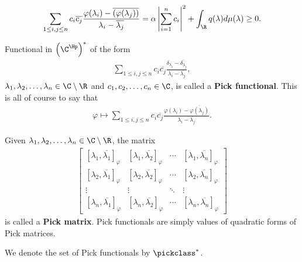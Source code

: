 \begin{align*}
	\sum_{1 \leq i, j \leq n} c_{i} \overline{c_{j}} \frac{\varphi(\lambda_{i}) - \overline{(\varphi(\lambda_{j}))}}{\lambda_{i} - \overline{\lambda_{j}}} = \alpha \left|\sum_{i = 1}^{n} c_{i}\right|^2 + \int_{\R} q(\lambda) d \mu (\lambda) \geq 0.
\end{align*}

\begin{maar}
	Functional in $\left(\C^{\Hp}\right)^{*}$ of the form
	\begin{align*}
		\sum_{1 \leq i, j \leq n} c_{i} \overline{c_{j}} \frac{\delta_{\lambda_{i}} - \overline{\delta_{\lambda_{j}}}}{\lambda_{i} - \overline{\lambda_{j}}},
	\end{align*}
	$\lambda_{1}, \lambda_{2}, \ldots, \lambda_{n} \in \C \setminus \R$ and $c_{1}, c_{2}, \ldots, c_{n} \in \C$, is called a \textbf{Pick functional}. This is all of course to say that
	\begin{align*}
		\varphi \mapsto \sum_{1 \leq i, j \leq n} c_{i} \overline{c_{j}} \frac{\varphi(\lambda_{i}) - \overline{\varphi(\lambda_{j})}}{\lambda_{i} - \overline{\lambda_{j}}}.
	\end{align*}
\end{maar}

Given $\lambda_{1}, \lambda_{2}, \ldots, \lambda_{n} \in \C \setminus \R$, the matrix
\begin{align*}\label{Pick_matrix}
	\begin{bmatrix}
		[\lambda_{1}, \overline{\lambda_{1}}]_{\varphi} & [\lambda_{1}, \overline{\lambda_{2}}]_{\varphi} & \cdots & [\lambda_{1}, \overline{\lambda_{n}}]_{\varphi} \\
		[\lambda_{2}, \overline{\lambda_{1}}]_{\varphi} & [\lambda_{2}, \overline{\lambda_{2}}]_{\varphi} & \cdots & [\lambda_{2}, \overline{\lambda_{n}}]_{\varphi} \\
		\vdots & \vdots & \ddots & \vdots \\
		[\lambda_{n}, \overline{\lambda_{1}}]_{\varphi} & [\lambda_{n}, \overline{\lambda_{2}}]_{\varphi} & \cdots &  [\lambda_{n}, \overline{\lambda_{n}}]_{\varphi}
	\end{bmatrix}
\end{align*}
is called a \textbf{Pick matrix}. Pick functionals are simply values of quadratic forms of Pick matrices.

We denote the set of Pick functionals by $\pickclass^{*}$.

